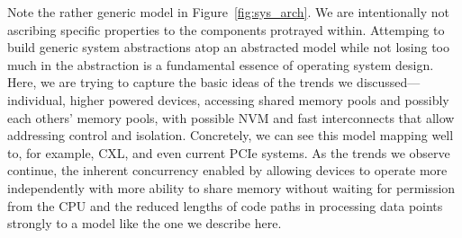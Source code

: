 Note the rather generic model in Figure~\ref{fig:sys_arch}. We are intentionally not ascribing specific properties to
the components protrayed within. Attemping to build generic system abstractions atop an abstracted model while not
losing too much in the abstraction is a fundamental essence of operating system design. Here, we are trying to capture
the basic ideas of the trends we discussed---individual, higher powered devices, accessing shared memory pools and
possibly each others' memory pools, with possible NVM and fast interconnects that allow addressing control and
isolation. Concretely, we can see this model mapping well to, for example, CXL, and even current PCIe systems. As the trends we observe continue, the inherent concurrency enabled by
allowing devices to operate more independently with more ability to share memory without waiting for permission from the
CPU and the reduced lengths of code paths in processing data points strongly to a model like the one we describe here.

